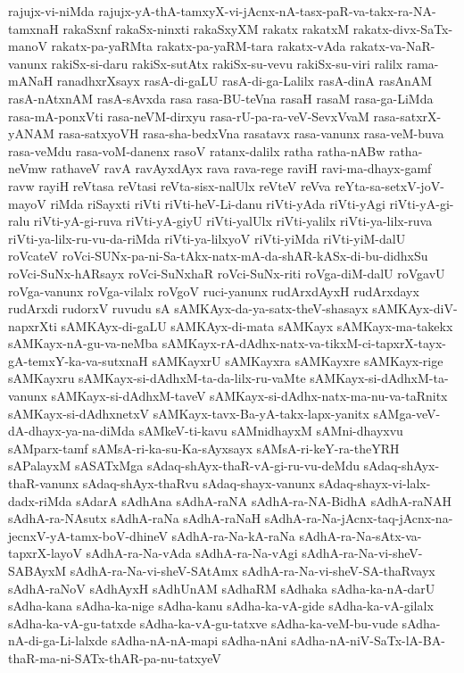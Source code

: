 {rajujx-vi-niMda
rajujx-yA-thA-tamxyX-vi-jAcnx-nA-tasx-paR-va-takx-ra-NA-tamxnaH
rakaSxnf
rakaSx-ninxti
rakaSxyXM
rakatx
rakatxM
rakatx-divx-SaTx-manoV
rakatx-pa-yaRMta
rakatx-pa-yaRM-tara
rakatx-vAda
rakatx-va-NaR-vanunx
rakiSx-si-daru
rakiSx-sutAtx
rakiSx-su-vevu
rakiSx-su-viri
ralilx
rama-mANaH
ranadhxrXsayx
rasA-di-gaLU
rasA-di-ga-Lalilx
rasA-dinA
rasAnAM
rasA-nAtxnAM
rasA-sAvxda
rasa
rasa-BU-teVna
rasaH
rasaM
rasa-ga-LiMda
rasa-mA-ponxVti
rasa-neVM-dirxyu
rasa-rU-pa-ra-veV-SevxVvaM
rasa-satxrX-yANAM
rasa-satxyoVH
rasa-sha-bedxVna
rasatavx
rasa-vanunx
rasa-veM-buva
rasa-veMdu
rasa-voM-danenx
rasoV
ratanx-dalilx
ratha
ratha-nABw
ratha-neVmw
rathaveV
ravA
ravAyxdAyx
rava
rava-rege
raviH
ravi-ma-dhayx-gamf
ravw
rayiH
reVtasa
reVtasi
reVta-sisx-nalUlx
reVteV
reVva
reYta-sa-setxV-joV-mayoV
riMda
riSayxti
riVti
riVti-heV-Li-danu
riVti-yAda
riVti-yAgi
riVti-yA-gi-ralu
riVti-yA-gi-ruva
riVti-yA-giyU
riVti-yalUlx
riVti-yalilx
riVti-ya-lilx-ruva
riVti-ya-lilx-ru-vu-da-riMda
riVti-ya-lilxyoV
riVti-yiMda
riVti-yiM-dalU
roVcateV
roVci-SUNx-pa-ni-Sa-tAkx-natx-mA-da-shAR-kASx-di-bu-didhxSu
roVci-SuNx-hARsayx
roVci-SuNxhaR
roVci-SuNx-riti
roVga-diM-dalU
roVgavU
roVga-vanunx
roVga-vilalx
roVgoV
ruci-yanunx
rudArxdAyxH
rudArxdayx
rudArxdi
rudorxV
ruvudu
sA
sAMKAyx-da-ya-satx-theV-shasayx
sAMKAyx-diV-napxrXti
sAMKAyx-di-gaLU
sAMKAyx-di-mata
sAMKayx
sAMKayx-ma-takekx
sAMKayx-nA-gu-va-neMba
sAMKayx-rA-dAdhx-natx-va-tikxM-ci-tapxrX-tayx-gA-temxY-ka-va-sutxnaH
sAMKayxrU
sAMKayxra
sAMKayxre
sAMKayx-rige
sAMKayxru
sAMKayx-si-dAdhxM-ta-da-lilx-ru-vaMte
sAMKayx-si-dAdhxM-ta-vanunx
sAMKayx-si-dAdhxM-taveV
sAMKayx-si-dAdhx-natx-ma-nu-va-taRnitx
sAMKayx-si-dAdhxnetxV
sAMKayx-tavx-Ba-yA-takx-lapx-yanitx
sAMga-veV-dA-dhayx-ya-na-diMda
sAMkeV-ti-kavu
sAMnidhayxM
sAMni-dhayxvu
sAMparx-tamf
sAMsA-ri-ka-su-Ka-sAyxsayx
sAMsA-ri-keY-ra-theYRH
sAPalayxM
sASATxMga
sAdaq-shAyx-thaR-vA-gi-ru-vu-deMdu
sAdaq-shAyx-thaR-vanunx
sAdaq-shAyx-thaRvu
sAdaq-shayx-vanunx
sAdaq-shayx-vi-lalx-dadx-riMda
sAdarA
sAdhAna
sAdhA-raNA
sAdhA-ra-NA-BidhA
sAdhA-raNAH
sAdhA-ra-NAsutx
sAdhA-raNa
sAdhA-raNaH
sAdhA-ra-Na-jAcnx-taq-jAcnx-na-jecnxV-yA-tamx-boV-dhineV
sAdhA-ra-Na-kA-raNa
sAdhA-ra-Na-sAtx-va-tapxrX-layoV
sAdhA-ra-Na-vAda
sAdhA-ra-Na-vAgi
sAdhA-ra-Na-vi-sheV-SABAyxM
sAdhA-ra-Na-vi-sheV-SAtAmx
sAdhA-ra-Na-vi-sheV-SA-thaRvayx
sAdhA-raNoV
sAdhAyxH
sAdhUnAM
sAdhaRM
sAdhaka
sAdha-ka-nA-darU
sAdha-kana
sAdha-ka-nige
sAdha-kanu
sAdha-ka-vA-gide
sAdha-ka-vA-gilalx
sAdha-ka-vA-gu-tatxde
sAdha-ka-vA-gu-tatxve
sAdha-ka-veM-bu-vude
sAdha-nA-di-ga-Li-lalxde
sAdha-nA-nA-mapi
sAdha-nAni
sAdha-nA-niV-SaTx-lA-BA-thaR-ma-ni-SATx-thAR-pa-nu-tatxyeV
}
